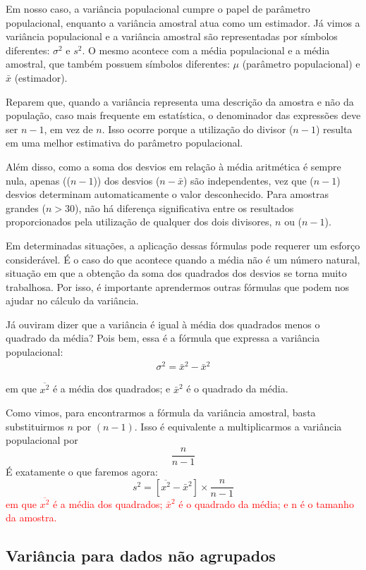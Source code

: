 Em nosso caso, a variância populacional cumpre o papel de parâmetro populacional, enquanto a variância
amostral atua como um estimador. Já vimos a variância populacional e a variância amostral são representadas por símbolos diferentes: $\sigma^2$ e $s^2$. O mesmo acontece com a média populacional e a média amostral, que também possuem símbolos diferentes: $\mu$ (parâmetro populacional) e $\bar{x}$ (estimador).

Reparem que, quando a variância representa uma descrição da amostra e não da população, caso mais frequente em estatística, o denominador das expressões deve ser $n - 1$, em vez de $n$. Isso ocorre porque a utilização do divisor ($n - 1$) resulta em uma melhor estimativa do parâmetro populacional.

Além disso, como a soma dos desvios em relação à média aritmética é sempre nula, apenas (($n - 1$)) dos desvios ($n - \bar{x}$) são independentes, vez que ($n - 1$) desvios determinam automaticamente o valor desconhecido. Para amostras grandes ($n > 30$), não há diferença significativa entre os resultados proporcionados pela utilização de qualquer dos dois divisores, $n$ ou ($n - 1$).

Em determinadas situações, a aplicação dessas fórmulas pode requerer um esforço considerável. É o caso do que acontece quando a média não é um número natural, situação em que a obtenção da soma dos quadrados dos desvios se torna muito trabalhosa. Por isso, é importante aprendermos outras fórmulas que podem nos ajudar no cálculo da variância.

Já ouviram dizer que a variância é igual à média dos quadrados menos o quadrado da média? Pois bem,
essa é a fórmula que expressa a variância populacional:
\begin{align*}
   \sigma^2=\bar{x}^2-\bar{x}^2
\end{align*}

em que \(\overline{x^2}\) é a média dos quadrados; e \(\bar{x}^2\) é o quadrado da média.

Como vimos, para encontrarmos a fórmula da variância amostral, basta substituirmos $n$ por $(n-1)$. Isso é
equivalente a multiplicarmos a variância populacional por
\[
    \frac{n}{n-1}
\]
É exatamente o que faremos agora:
\[
    s^2=[\overline{x^2}-\bar{x}^2]\times \frac{n}{n-1}
\]
\textcolor{red}{em que $\overline{x^2}$ é a média dos quadrados; $\bar{x}^2$ é o quadrado da média; e n é o tamanho da amostra.}

\subsection{Variância para dados não agrupados}

